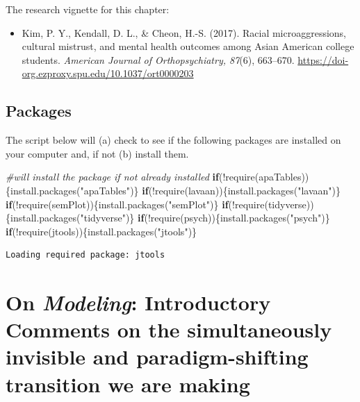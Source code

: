\documentclass[
]{book}
\newenvironment{Shaded}{\begin{snugshade}}{\end{snugshade}}
\newcommand{\CommentTok}[1]{\textcolor[rgb]{0.56,0.35,0.01}{\textit{#1}}}
\newcommand{\ControlFlowTok}[1]{\textcolor[rgb]{0.13,0.29,0.53}{\textbf{#1}}}
\newcommand{\FunctionTok}[1]{\textcolor[rgb]{0.00,0.00,0.00}{#1}}
\newcommand{\NormalTok}[1]{#1}
\newcommand{\SpecialCharTok}[1]{\textcolor[rgb]{0.00,0.00,0.00}{#1}}
\newcommand{\StringTok}[1]{\textcolor[rgb]{0.31,0.60,0.02}{#1}}
\providecommand{\tightlist}{%
  \setlength{\itemsep}{0pt}\setlength{\parskip}{0pt}}
\begin{document}
The research vignette for this chapter:

\begin{itemize}
\tightlist
\item
  Kim, P. Y., Kendall, D. L., \& Cheon, H.-S. (2017). Racial microaggressions, cultural mistrust, and mental health outcomes among Asian American college students. \emph{American Journal of Orthopsychiatry, 87}(6), 663--670. \url{https://doi-org.ezproxy.spu.edu/10.1037/ort0000203}
\end{itemize}

\hypertarget{packages-7}{%
\subsection{Packages}\label{packages-7}}

The script below will (a) check to see if the following packages are installed on your computer and, if not (b) install them.

\begin{Shaded}
\begin{Highlighting}[]
\CommentTok{\#will install the package if not already installed}
\ControlFlowTok{if}\NormalTok{(}\SpecialCharTok{!}\FunctionTok{require}\NormalTok{(apaTables))\{}\FunctionTok{install.packages}\NormalTok{(}\StringTok{"apaTables"}\NormalTok{)\}}
\ControlFlowTok{if}\NormalTok{(}\SpecialCharTok{!}\FunctionTok{require}\NormalTok{(lavaan))\{}\FunctionTok{install.packages}\NormalTok{(}\StringTok{"lavaan"}\NormalTok{)\}}
\ControlFlowTok{if}\NormalTok{(}\SpecialCharTok{!}\FunctionTok{require}\NormalTok{(semPlot))\{}\FunctionTok{install.packages}\NormalTok{(}\StringTok{"semPlot"}\NormalTok{)\}}
\ControlFlowTok{if}\NormalTok{(}\SpecialCharTok{!}\FunctionTok{require}\NormalTok{(tidyverse))\{}\FunctionTok{install.packages}\NormalTok{(}\StringTok{"tidyverse"}\NormalTok{)\}}
\ControlFlowTok{if}\NormalTok{(}\SpecialCharTok{!}\FunctionTok{require}\NormalTok{(psych))\{}\FunctionTok{install.packages}\NormalTok{(}\StringTok{"psych"}\NormalTok{)\}}
\ControlFlowTok{if}\NormalTok{(}\SpecialCharTok{!}\FunctionTok{require}\NormalTok{(jtools))\{}\FunctionTok{install.packages}\NormalTok{(}\StringTok{"jtools"}\NormalTok{)\}}
\end{Highlighting}
\end{Shaded}

\begin{verbatim}
Loading required package: jtools
\end{verbatim}

\hypertarget{on-modeling-introductory-comments-on-the-simultaneously-invisible-and-paradigm-shifting-transition-we-are-making}{%
\section{\texorpdfstring{On \emph{Modeling}: Introductory Comments on the simultaneously invisible and paradigm-shifting transition we are making}{On Modeling: Introductory Comments on the simultaneously invisible and paradigm-shifting transition we are making}}\label{on-modeling-introductory-comments-on-the-simultaneously-invisible-and-paradigm-shifting-transition-we-are-making}}
\end{document}
